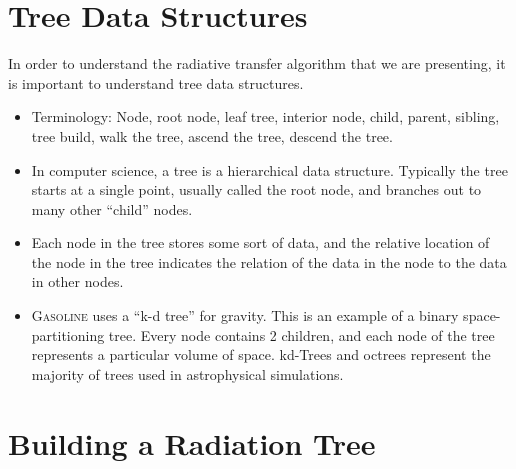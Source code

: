 \section{Tree Data Structures}
\label{sec:treestruct}

In order to understand the radiative transfer algorithm that we are presenting, it is important to understand tree data structures.

\begin{itemize}
\item Terminology: Node, root node, leaf tree, interior node, child, parent, sibling, tree build, walk the tree, ascend the tree, descend the tree.
\item In computer science, a tree is a hierarchical data structure. Typically the tree starts at a single point, usually called the root node, and branches out to many other ``child'' nodes.
\item Each node in the tree stores some sort of data, and the relative location of the node in the tree indicates the relation of the data in the node to the data in other nodes.
\item \textsc{Gasoline} uses a ``k-d tree'' for gravity. This is an example of a binary space-partitioning tree. Every node contains 2 children, and each node of the tree represents a particular volume of space. kd-Trees and octrees represent the majority of trees used in astrophysical simulations.
\end{itemize}

\section{Building a Radiation Tree}
\label{sec:buildingtree}

